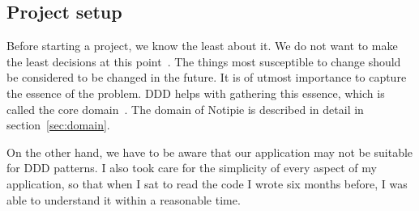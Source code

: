 \subsection{Project setup}\label{sec:project-setup}

Before starting a project,
we know the least about it.
We do not want to make the least decisions
at this point~\cite{beck_extreme_2004}.
The things most susceptible to change
should be considered to be changed in the future.
It is of utmost importance to capture
the essence of the problem.
\Ac{DDD} helps with
gathering this essence,
which is called
the core domain~\cite[Part~I, Chapter~3]{millett_patterns_2015}.
The domain of Notipie is described in detail
in section~\ref{sec:domain}.

On the other hand,
we have to be aware that our application
may not be suitable for \ac{DDD} patterns.
I also took care for the simplicity
of every aspect of my application,
so that when I sat to read the code
I wrote six months before,
I was able to understand it
within a reasonable time.
